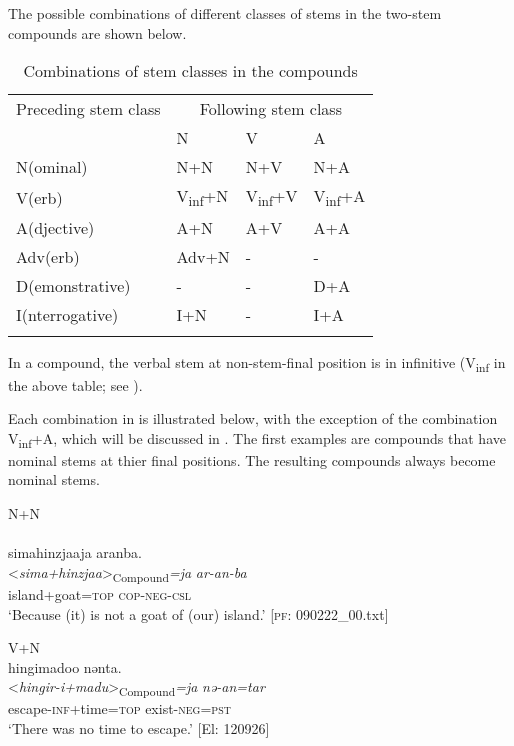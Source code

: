   The possible combinations of different classes of stems in the two-stem compounds are shown below.

\begin{table}
\caption{\label{tab:25}Combinations of stem classes in the compounds}
\begin{tabularx}{\textwidth}{XXXl}
\lsptoprule
Preceding stem class  & \multicolumn{3}{c}{Following stem class}\\\cmidrule(lr){2-4}
& N & V & A\\\midrule
N(ominal)       & N+N  & N+V & N+A\\
V(erb)          & V\textsubscript{inf}+N &  V\textsubscript{inf}+V & V\textsubscript{inf}+A\\
A(djective)     & A+N & A+V & A+A\\
Adv(erb)        & Adv+N & {}-  & {}-\\
D(emonstrative) & {}- & {}- & D+A\\
I(nterrogative) & I+N & {}- & I+A\\
\lspbottomrule
\end{tabularx}
\end{table}

In a compound, the verbal stem at non-stem-final position is in infinitive (V\textsubscript{inf} in the above table; see ).

Each combination in  is illustrated below, with the exception of the combination V\textsubscript{inf}+A, which will be discussed in . The first examples are compounds that have nominal stems at thier final positions. The resulting compounds always become nominal stems.

\ea \label{ex:4.24}
\ea N+N \label{ex:4.24a}\\\\
\glll  simahinzjaaja  aranba.\\
      <\textit{sima+hinzjaa}>\textsubscript{Compound}\textit{=ja}  \textit{ar-an-ba}\\
      island+goat=\textsc{top}  \textsc{cop}-\textsc{neg}-\textsc{csl}\\
      \glt       ‘Because (it) is not a goat of (our) island.’ [\textsc{pf}: 090222\_00.txt]

\ex  V+N\\
\glll    hingimadoo  nənta.\\
      <\textit{hingir-i+madu}>\textsubscript{Compound}\textit{=ja}  \textit{nə-an=tar}\\
      escape-\textsc{inf}+time=\textsc{top}  exist-\textsc{neg}=\textsc{pst}\\
      \glt       ‘There was no time to escape.’ [El: 120926]

